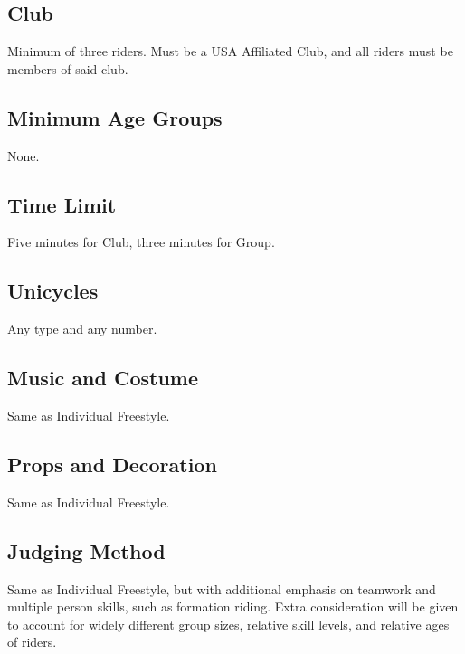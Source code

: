 \subsection{Club}
Minimum of three riders. Must be a USA Affiliated Club, and all riders must be members of said club.

\subsection{Minimum Age Groups}
None.

\subsection{Time Limit}
Five minutes for Club, three minutes for Group.

\subsection{Unicycles}
Any type and any number.

\subsection{Music and Costume}
Same as Individual Freestyle.

\subsection{Props and Decoration}
Same as Individual Freestyle.

\subsection{Judging Method}
Same as Individual Freestyle, but with additional emphasis on teamwork and multiple person skills, such as formation riding.
Extra consideration will be given to account for widely different group sizes, relative skill levels, and relative ages of riders.
